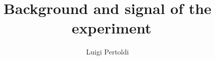 


\title{Background and signal of the \gerda\ experiment}
\author{Luigi Pertoldi}



  \maketitle

  \begin{abstract}
    \lipsum[1]
  \end{abstract}
  \tableofcontents

  \setcounter{page}{1} %
  \renewcommand{\thepage}{\scshape\roman{page}} %
  


